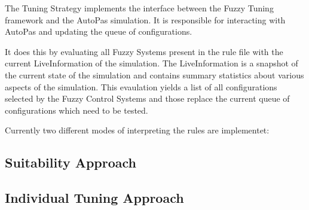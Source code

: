 The Tuning Strategy implements the interface between the Fuzzy Tuning framework and the AutoPas simulation. It is responsible for interacting with AutoPas and updating the queue of configurations.

It does this by evaluating all Fuzzy Systems present in the rule file with the current LiveInformation of the simulation. The LiveInformation is a snapshot of the current state of the simulation and contains summary statistics about various aspects of the simulation. This evaulation yields a list of all configurations selected by the Fuzzy Control Systems and those replace the current queue of configurations which need to be tested.


Currently two different modes of interpreting the rules are implementet:

\subsection*{Suitability Approach}



\subsection*{Individual Tuning Approach}

